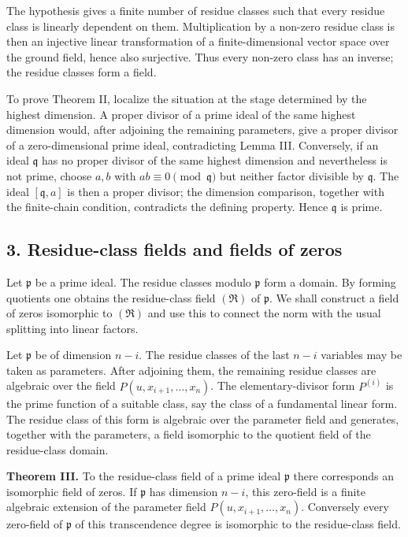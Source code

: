 \documentclass[12pt]{article}
\begin{document}
The hypothesis gives a finite number of residue classes such that every residue class is linearly dependent on them. Multiplication by a non-zero residue class is then an injective linear transformation of a finite-dimensional vector space over the ground field, hence also surjective. Thus every non-zero class has an inverse; the residue classes form a field.

To prove Theorem II, localize the situation at the stage determined by the highest dimension. A proper divisor of a prime ideal of the same highest dimension would, after adjoining the remaining parameters, give a proper divisor of a zero-dimensional prime ideal, contradicting Lemma III. Conversely, if an ideal $\mathfrak q$ has no proper divisor of the same highest dimension and nevertheless is not prime, choose $a,b$ with $ab\equiv0\pmod{\mathfrak q}$ but neither factor divisible by $\mathfrak q$. The ideal $[\mathfrak q,a]$ is then a proper divisor; the dimension comparison, together with the finite-chain condition, contradicts the defining property. Hence $\mathfrak q$ is prime.

\subsection{3. Residue-class fields and fields of zeros}

Let $\mathfrak p$ be a prime ideal. The residue classes modulo $\mathfrak p$ form a domain. By forming quotients one obtains the residue-class field $(\mathfrak R)$ of $\mathfrak p$. We shall construct a field of zeros isomorphic to $(\mathfrak R)$ and use this to connect the norm with the usual splitting into linear factors.

Let $\mathfrak p$ be of dimension $n-i$. The residue classes of the last $n-i$ variables may be taken as parameters. After adjoining them, the remaining residue classes are algebraic over the field $P(u,x_{i+1},\ldots,x_n)$. The elementary-divisor form $P^{(i)}$ is the prime function of a suitable class, say the class of a fundamental linear form. The residue class of this form is algebraic over the parameter field and generates, together with the parameters, a field isomorphic to the quotient field of the residue-class domain.

\textbf{Theorem III.} To the residue-class field of a prime ideal $\mathfrak p$ there corresponds an isomorphic field of zeros. If $\mathfrak p$ has dimension $n-i$, this zero-field is a finite algebraic extension of the parameter field $P(u,x_{i+1},\ldots,x_n)$. Conversely every zero-field of $\mathfrak p$ of this transcendence degree is isomorphic to the residue-class field.
\end{document}

